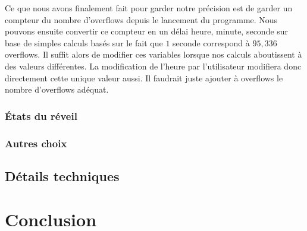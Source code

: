 \documentclass[12pt,a4paper]{article}
\begin{document}
    Ce que nous avons finalement fait pour garder notre précision est de garder un compteur du nombre d'overflows depuis le lancement du programme. Nous pouvons ensuite convertir ce compteur en un délai heure, minute, seconde sur base de simples calculs basés sur le fait que $1$ seconde correspond à $95,336$ overflows. Il suffit alors de modifier ces variables lorsque nos calculs aboutissent à des valeurs différentes. La modification de l'heure par l'utilisateur modifiera donc directement cette unique valeur aussi. Il faudrait juste ajouter à overflows le nombre d'overflows adéquat.\\
    
    \subsubsection{\'Etats du réveil}
    
    \subsubsection{Autres choix}
    
    \subsection{Détails techniques}
    
\section{Conclusion}
    
\end{document}
